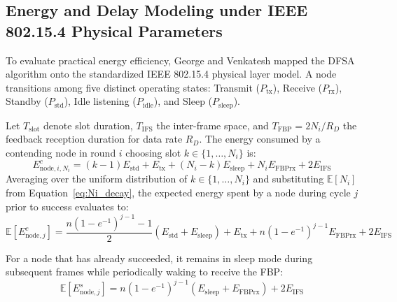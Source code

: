 \subsection{Energy and Delay Modeling under IEEE 802.15.4 Physical Parameters}
To evaluate practical energy efficiency, George and Venkatesh \cite{george2018performance} mapped the DFSA algorithm onto the standardized IEEE 802.15.4 physical layer model. A node transitions among five distinct operating states: Transmit ($P_{\mathrm{tx}}$), Receive ($P_{\mathrm{rx}}$), Standby ($P_{\mathrm{std}}$), Idle listening ($P_{\mathrm{idle}}$), and Sleep ($P_{\mathrm{sleep}}$).

Let $T_{\mathrm{slot}}$ denote slot duration, $T_{\mathrm{IFS}}$ the inter-frame space, and $T_{\mathrm{FBP}} = 2 N_i / R_D$ the feedback reception duration for data rate $R_D$. The energy consumed by a contending node in round $i$ choosing slot $k \in \{1, \dots, N_i\}$ is:
\begin{equation}
    E_{\mathrm{node}, i, N_i}^c = (k - 1) E_{\mathrm{std}} + E_{\mathrm{tx}} + (N_i - k) E_{\mathrm{sleep}} + N_i E_{\mathrm{FBPrx}} + 2 E_{\mathrm{IFS}}
\end{equation}
Averaging over the uniform distribution of $k \in \{1, \dots, N_i\}$ and substituting $\mathbb{E}[N_i]$ from Equation~\eqref{eq:Ni_decay}, the expected energy spent by a node during cycle $j$ prior to success evaluates to:
\begin{equation}
    \mathbb{E}[E_{\mathrm{node}, j}^c] = \frac{n(1 - e^{-1})^{j-1} - 1}{2} (E_{\mathrm{std}} + E_{\mathrm{sleep}}) + E_{\mathrm{tx}} + n(1 - e^{-1})^{j-1} E_{\mathrm{FBPrx}} + 2 E_{\mathrm{IFS}}
\end{equation}

For a node that has already succeeded, it remains in sleep mode during subsequent frames while periodically waking to receive the FBP:
\begin{equation}
    \mathbb{E}[E_{\mathrm{node}, j}^s] = n (1 - e^{-1})^{j-1} (E_{\mathrm{sleep}} + E_{\mathrm{FBPrx}}) + 2 E_{\mathrm{IFS}}
\end{equation}


